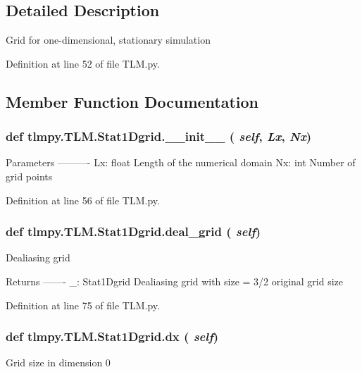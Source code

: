 \subsection{Detailed Description}
\begin{DoxyVerb}
Grid for one-dimensional, stationary simulation
\end{DoxyVerb}
 

Definition at line 52 of file TLM.py.

\subsection{Member Function Documentation}
\hypertarget{classtlmpy_1_1TLM_1_1Stat1Dgrid_a168a4b02ca5ce736bd4f7f02bbbbcce1}{
\subsubsection[{\_\-\_\-init\_\-\_\-}]{\setlength{\rightskip}{0pt plus 5cm}def tlmpy.TLM.Stat1Dgrid.\_\-\_\-init\_\-\_\- ( {\em self}, \/   {\em Lx}, \/   {\em Nx})}}
\label{classtlmpy_1_1TLM_1_1Stat1Dgrid_a168a4b02ca5ce736bd4f7f02bbbbcce1}
\begin{DoxyVerb}
Parameters
----------
Lx: float
    Length of the numerical domain
Nx: int
    Number of grid points
\end{DoxyVerb}
 

Definition at line 56 of file TLM.py.\hypertarget{classtlmpy_1_1TLM_1_1Stat1Dgrid_a8faf7e5067109d71f7e3d06e8f57063a}{
\subsubsection[{deal\_\-grid}]{\setlength{\rightskip}{0pt plus 5cm}def tlmpy.TLM.Stat1Dgrid.deal\_\-grid ( {\em self})}}
\label{classtlmpy_1_1TLM_1_1Stat1Dgrid_a8faf7e5067109d71f7e3d06e8f57063a}
\begin{DoxyVerb}
Dealiasing grid

Returns
-------
_: Stat1Dgrid
    Dealiasing grid with size = 3/2 original grid size
\end{DoxyVerb}
 

Definition at line 75 of file TLM.py.\hypertarget{classtlmpy_1_1TLM_1_1Stat1Dgrid_ad5be7c65a631c03818fdda066b88b9e0}{
\subsubsection[{dx}]{\setlength{\rightskip}{0pt plus 5cm}def tlmpy.TLM.Stat1Dgrid.dx ( {\em self})}}
\label{classtlmpy_1_1TLM_1_1Stat1Dgrid_ad5be7c65a631c03818fdda066b88b9e0}
\begin{DoxyVerb}Grid size in dimension 0\end{DoxyVerb}
 

